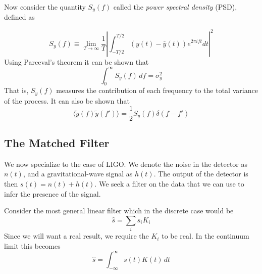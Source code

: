 Now consider the quantity $S_y(f)$ called the \emph{power spectral
density} (PSD), defined as

\begin{equation}
\label{eq:psd1}
S_y(f) \equiv \lim_{T \to \infty} 
\frac{1}{T} \left| \int_{-T/2}^{T/2} (y(t) - \bar{y}(t))
e^{2 \pi i f t} dt \right|^2
\end{equation}
%
Using Parceval's theorem it can be shown that
%
\begin{equation*}
\int_0^\infty S_y(f)\, df = \sigma^2_y
\end{equation*}
%
That is, $S_y(f)$ measures the contribution of each frequency 
to the total variance of the process.
%
It can also be shown that 
%
\begin{equation}
\label{eq:psd2}
\langle \tilde{y}(f) \tilde{y}(f')\rangle = \frac{1}{2} S_y(f)
\delta(f-f')
\end{equation}

\subsection{The Matched Filter}
\label{ssec:matched_filter}

We now specialize to the case of LIGO.  We denote the noise in the
detector as $n(t)$, and a gravitational-wave signal as $h(t)$.  The
output of the detector is then $s(t)=n(t)+h(t)$.  We seek a filter on
the data that we can use to infer the presence of the signal.

Consider the most general linear filter which in the discrete case
would be
%
\begin{equation}
\hat{s} = \sum_i s_i K_i
\end{equation}
%
Since we will want a real result, we require the $K_i$ to be real.  In
the continuum limit this becomes
%
\begin{equation}
\hat{s} = \int_{-\infty}^\infty s(t) K(t)\, dt
\end{equation}

